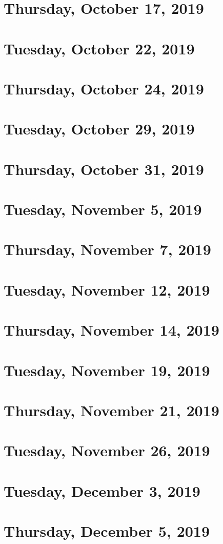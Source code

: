 \documentclass{../mynotes}
\begin{document}
\section{Thursday, October 17, 2019}
    

\section{Tuesday, October 22, 2019}
    

\section{Thursday, October 24, 2019}
    

\section{Tuesday, October 29, 2019}
    
\section{Thursday, October 31, 2019}
    
    
\section{Tuesday, November 5, 2019}
    
\section{Thursday, November 7, 2019}
    

\section{Tuesday, November 12, 2019}
    
\section{Thursday, November 14, 2019}
    
    
\section{Tuesday, November 19, 2019}
    
\section{Thursday, November 21, 2019}
    
    
\section{Tuesday, November 26, 2019}
    

\section{Tuesday, December 3, 2019}
    
\section{Thursday, December 5, 2019}
    
\end{document}
